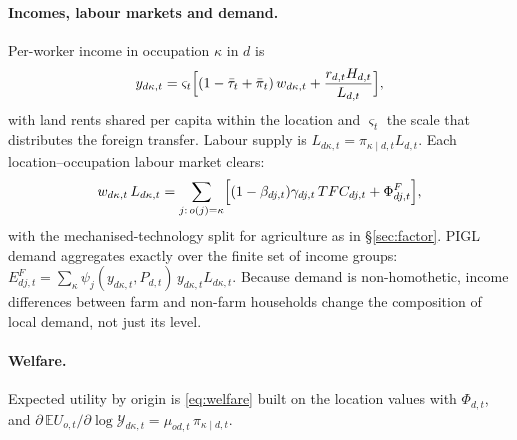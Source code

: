 \documentclass[11pt]{article}
\begin{document}
\paragraph{Incomes, labour markets and demand.} Per-worker income in occupation $\kappa$ in $d$ is
\begin{equation}
  y_{d\kappa,t}=\varsigma_{t}\Bigl[(1-\bar\tau_t+\bar\pi_t)\,w_{d\kappa,t}+\frac{r_{d,t}H_{d,t}}{L_{d,t}}\Bigr],
\end{equation}
with land rents shared per capita within the location and $\varsigma_t$ the scale that
distributes the foreign transfer. Labour supply is $L_{d\kappa,t}=\pi_{\kappa\mid d,t}L_{d,t}$.
Each location--occupation labour market clears:
\begin{equation}
  w_{d\kappa,t}\,L_{d\kappa,t}=\sum_{j:\,o(j)=\kappa}\Bigl[(1-\beta_{dj,t})\gamma_{dj,t}\,TFC_{dj,t}+\Phi^{F}_{dj,t}\Bigr],
  \label{eq:occclear}
\end{equation}
with the mechanised-technology split for agriculture as in \S\ref{sec:factor}. PIGL demand
aggregates exactly over the finite set of income groups:
$E^{F}_{dj,t}=\sum_{\kappa}\psi_{j}(y_{d\kappa,t},P_{d,t})\,y_{d\kappa,t}L_{d\kappa,t}$.
Because demand is non-homothetic, income differences between farm and non-farm households
change the composition of local demand, not just its level.

\paragraph{Welfare.} Expected utility by origin is \eqref{eq:welfare} built on the location
values with $\Phi_{d,t}$, and
$\partial\,\mathbb{E}U_{o,t}/\partial\log\mathcal{Y}_{d\kappa,t}=\mu_{od,t}\,\pi_{\kappa\mid d,t}$.
\end{document}
